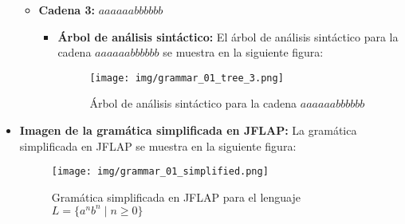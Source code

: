 \documentclass[11pt]{report}
\begin{document}
\begin{itemize}
\begin{itemize}
\begin{itemize}
    \end{itemize}
    \item \textbf{Cadena 3:} $aaaaaabbbbbb$
    \begin{itemize}
      \item \textbf{Árbol de análisis sintáctico:} El árbol de análisis sintáctico para la cadena $aaaaaabbbbbb$ se muestra en la siguiente figura:
      \begin{figure}[H]
        \centering
        \texttt{[image: img/grammar\_01\_tree\_3.png]}
        \caption{Árbol de análisis sintáctico para la cadena $aaaaaabbbbbb$}
        \label{fig:arbol3}
      \end{figure}
    \end{itemize}
  \end{itemize}
  \item \textbf{Imagen de la gramática simplificada en JFLAP:} La gramática simplificada en JFLAP se muestra en la siguiente figura:
  \begin{figure}[H]
    \centering
    \texttt{[image: img/grammar\_01\_simplified.png]}
    \caption{Gramática simplificada en JFLAP para el lenguaje $L = \{a^n b^n \mid n \geq 0\}$}
    \label{fig:gramatica1_simplified}
  \end{figure}
\end{itemize}

\newpage
\end{document}
